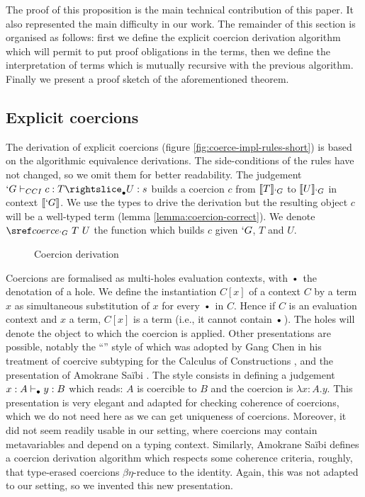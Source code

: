\documentclass{llncs}
\begin{document}
The proof of this proposition is the main technical contribution of this
paper. It also represented the main difficulty in our work. 
The remainder of this section is organised as follows: first we 
define the explicit coercion derivation algorithm which will permit to
put proof obligations in the terms, then we define the
interpretation of terms which is mutually recursive with the previous
algorithm. Finally we present a proof sketch of the aforementioned
theorem.

\subsection{Explicit coercions}
The derivation of explicit coercions (figure
\vref{fig:coerce-impl-rules-short}) is based on the
algorithmic equivalence derivations.  
The side-conditions of the rules have not changed, so we omit them for
better readability. The judgement $\subimpl{`G}{c}{T}{U}{s}$ builds a
coercion $c$ from $\llbracket T \rrbracket_{`G}$ to $\llbracket U \rrbracket_{`G}$ in context $\llbracket `G \rrbracket$.
We use the \lng{} types to drive the
derivation but the resulting object $c$ will be a well-typed \Coq{} term
(lemma \ref{lemma:coercion-correct}). We denote $\coerce{`G}{T}{U}$
the function which builds $c$ given $`G$, $T$ and $U$.

\begin{figure}[ht]
  \vspace{-1em}
  \subtisc
  \vspace{-1em}
  \caption{Coercion derivation}
  \label{fig:coerce-impl-rules-short}
  \vspace{-1em}
\end{figure}

Coercions are formalised as multi-holes evaluation contexts, with
$\ctxdot$ the denotation of a hole. We define the instantiation $C[x]$ of a context $C$
by a term $x$ as simultaneous substitution of $x$ for every $\ctxdot$ in $C$.
Hence if $C$ is an evaluation context and $x$ a term, $C[x]$ is a term
(i.e., it cannot contain $\ctxdot$).
The holes will denote the object to which the coercion is applied.
Other
presentations are possible, notably the ``\LMS{}'' style of \cite{longo95logic} which
was adopted by Gang Chen in his treatment of coercive subtyping for the
Calculus of Constructions \cite{conf/popl/Chen03}, and the presentation 
of Amokrane Sa\"ibi \cite{saibi97inheritance}. The \LMS{} style consists
in defining a judgement $x : A \vdash_{\bullet} y : B$ which reads: $A$ is
coercible to $B$ and the coercion is $\lambda x : A.y$. This
presentation is very elegant and adapted for checking coherence 
of coercions, which we do not need here as we can get uniqueness
of coercions. Moreover, it did not seem readily usable in
our setting, where coercions may contain metavariables and depend on a
typing context. Similarly, Amokrane Sa\"ibi defines
a coercion derivation algorithm which respects some coherence criteria,
roughly, that type-erased coercions $\beta\eta$-reduce to the
identity. Again, this was not adapted to our setting, so we invented this
new presentation. 
 
\end{document}
